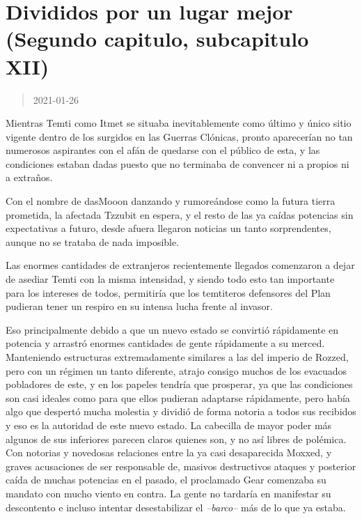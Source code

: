 \documentclass[
  spanish,
]{book}
\begin{document}
\hypertarget{divididos-por-un-lugar-mejor-segundo-capitulo-subcapitulo-xii}{%
\section{Divididos por un lugar mejor (Segundo capitulo, subcapitulo XII)}\label{divididos-por-un-lugar-mejor-segundo-capitulo-subcapitulo-xii}}

\begin{quote}
2021-01-26
\end{quote}

Mientras Temti como Itmet se situaba inevitablemente como último y único sitio vigente dentro de los surgidos en las Guerras Clónicas, pronto aparecerían no tan numerosos aspirantes con el afán de quedarse con el público de esta, y las condiciones estaban dadas puesto que no terminaba de convencer ni a propios ni a extraños.

Con el nombre de dasMooon danzando y rumoreándose como la futura tierra prometida, la afectada Tzzubit en espera, y el resto de las ya caídas potencias sin expectativas a futuro, desde afuera llegaron noticias un tanto sorprendentes, aunque no se trataba de nada imposible.

Las enormes cantidades de extranjeros recientemente llegados comenzaron a dejar de asediar Temti con la misma intensidad, y siendo todo esto tan importante para los intereses de todos, permitiría que los temtiteros defensores del Plan pudieran tener un respiro en su intensa lucha frente al invasor.

Eso principalmente debido a que un nuevo estado se convirtió rápidamente en potencia y arrastró enormes cantidades de gente rápidamente a su merced. Manteniendo estructuras extremadamente similares a las del imperio de Rozzed, pero con un régimen un tanto diferente, atrajo consigo muchos de los evacuados pobladores de este, y en los papeles tendría que prosperar, ya que las condiciones son casi ideales como para que ellos pudieran adaptarse rápidamente, pero había algo que despertó mucha molestia y dividió de forma notoria a todos sus recibidos y eso es la autoridad de este nuevo estado.
La cabecilla de mayor poder más algunos de sus inferiores parecen claros quienes son, y no así libres de polémica. Con notorias y novedosas relaciones entre la ya casi desaparecida Moxxed, y graves acusaciones de ser responsable de, masivos destructivos ataques y posterior caída de muchas potencias en el pasado, el proclamado Gear comenzaba su mandato con mucho viento en contra. La gente no tardaría en manifestar su descontento e incluso intentar desestabilizar el \emph{--barco--} más de lo que ya estaba.
\end{document}
